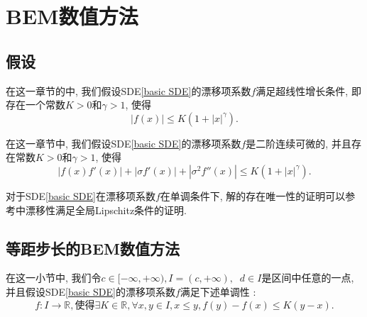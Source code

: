 

\chapter{BEM数值方法}

\section{假设}


	



\begin{assumption}\label{super linear growth}
	
	在这一章节的中, 我们假设SDE\cref{basic SDE}的漂移项系数$f$满足超线性增长条件, 即存在一个常数$K>0$和$\gamma>1$, 使得
	\begin{equation}
		|f(x)| \le K(1+|x|^{\gamma}). 
	\end{equation}
\end{assumption}

\begin{assumption}\label{momentBEM}
	在这一章节中, 我们假设SDE\cref{basic SDE}的漂移项系数$f$是二阶连续可微的, 并且存在常数$K>0$和$\gamma>1$, 使得
	\begin{equation}
		|f(x)f'(x)| + |\sigma f'(x)| + |\sigma^2 f''(x)| \leq K(1 + |x|^{\gamma}).
	\end{equation}
	
\end{assumption}
对于SDE\cref{basic SDE}在漂移项系数$f$在单调条件下, 解的存在唯一性的证明可以参考\cite{umarov2018beyond}中漂移性满足全局Lipschitz条件的证明.

\section{等距步长的BEM数值方法}

\begin{assumption}\label{monotony}
在这一小节中, 我们令$c\in[-\infty,+\infty),I=(c,+\infty),\operatorname{}d\in I$是区间中任意的一点, 并且假设SDE\cref{basic SDE}的漂移项系数$f$满足下述单调性 :
\begin{equation}
	f:I\to\mathbb{R}  , 使得 \exists K \in\mathbb{R},\forall x,y\in I,x\leq y,f(y)-f(x)\leq K(y-x).
\end{equation}
\end{assumption}

